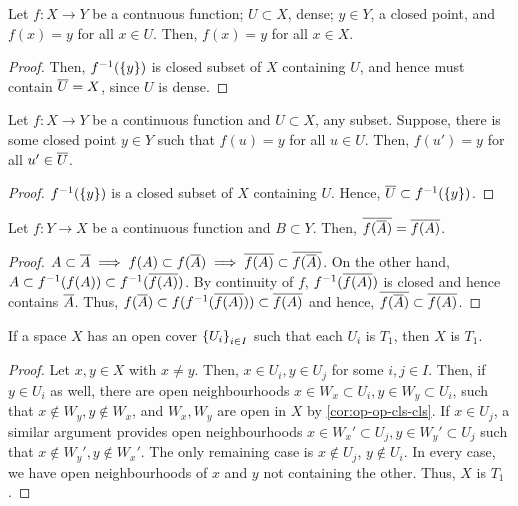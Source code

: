 \begin{lem}\label{lem:const-cont-fun-dense}
Let $f : X \to Y$ be a contnuous function; $U \subset X$, dense; $y \in Y$,
a closed point, and $f(x) = y$ for all $x \in U$. Then, $f(x) = y$
for all $x \in X$.
\end{lem}
\begin{proof}
Then, $f^{-1}(\set{y})$ is closed subset of $X$ containing $U$, and hence
must contain $\cls{U} = X$, since $U$ is dense.
\end{proof}

\begin{lem}\label{lem:cont-lim-pt}
Let $f : X \to Y$ be a continuous function and $U \subset X$, any subset.
Suppose, there is some closed point $y \in Y$ such that $f(u) = y$ for all
$u \in U$.
Then, $f(u') = y$ for all $u' \in \cls{U}$.
\end{lem}
\begin{proof}
$f^{-1}\br{\set{y}}$ is a closed subset of $X$ containing $U$. Hence,
$\cls{U} \subset f^{-1}(\set{y})$.
\end{proof}

\begin{lem}\label{lem:cls-im}
Let $f : Y \to X$ be a continuous function and $B \subset Y$.
Then, $\cls{f(\cls{A})} = \cls{f(A)}$.
\end{lem}
\begin{proof}
$A \subset \cls{A} \implies f(A) \subset f(\cls{A})
\implies \cls{f(A)} \subset \cls{f(\cls{A})}$.
On the other hand,
$A \subset f^{-1}(f(A)) \subset f^{-1}(\cls{f(A)})$. By continuity
of $f$, $f^{-1}(\cls{f(A)})$ is closed and hence contains $\cls{A}$.
Thus, $f(\cls{A}) \subset f(f^{-1}(\cls{f(A)})) \subset \cls{f(A)}$
and hence, $\cls{f(\cls{A})} \subset \cls{f(A)}$.
\end{proof}

\begin{lem}\label{lem:open-cov-T1}
If a space $X$ has an open cover $\set{U_i}_{i \in I}$ such that
each $U_i$ is $T_1$, then $X$ is $T_1$.
\end{lem}
\begin{proof}
Let $x, y \in X$ with $x \neq y$. Then, $x \in U_i, y \in U_j$ for some
$i, j \in I$. Then, if $y \in U_i$ as well, there
are open neighbourhoods $x \in W_x \subset U_i, y \in W_y \subset U_i$,
such that $x \not\in W_y, y \not\in W_x$, and $W_x, W_y$ are open in
$X$ by \cref{cor:op-op-cls-cls}. If $x \in U_j$, a similar argument
provides open neighbourhoods $x \in W_x' \subset U_j, y \in W_y' \subset U_j$
such that $x \not\in W_y', y \not\in W_x'$.
The only remaining case is $x \not\in U_j$, $y \not\in U_i$.
In every case, we have open neighbourhoods of $x$ and $y$
not containing the other. Thus, $X$ is $T_1$.
\end{proof}
